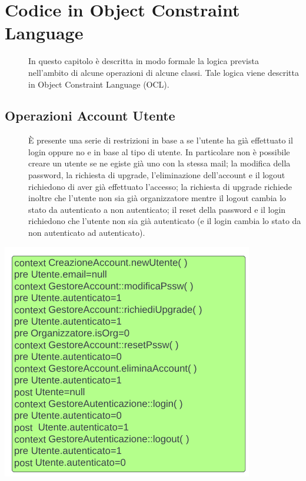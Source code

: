 \documentclass{article}
\begin{document}
\section{Codice in Object Constraint Language}
\begin{description}
    \item[] In questo capitolo è descritta in modo formale la logica prevista nell’ambito di alcune operazioni di alcune classi. Tale logica viene descritta in Object Constraint Language (OCL).
\end{description}
\subsection{Operazioni Account Utente}
\begin{description}
    \item[] È presente una serie di restrizioni in base a se l'utente ha già effettuato il login oppure no e in base al tipo di utente. In particolare non è possibile creare un utente se ne egiste già uno con la stessa mail; la modifica della password, la richiesta di upgrade, l'eliminazione dell'account e il logout richiedono di aver già effettuato l'accesso; la richiesta di upgrade richiede inoltre che l'utente non sia già organizzatore mentre il logout cambia lo stato da autenticato a non autenticato; il reset della password e il login richiedono che l'utente non sia già autenticato (e il login cambia lo stato da non autenticato ad autenticato).
\end{description}
\begin{center}
    \item[] \includegraphics[scale=0.4]{oclGestoreUtenti.png}
\end{center}
\end{document}
